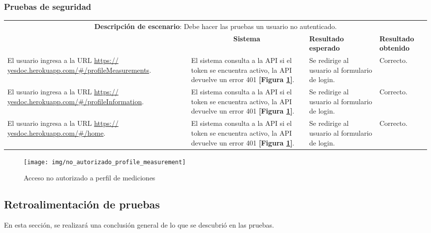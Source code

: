 \subsubsection{Pruebas de seguridad }
\begin{center}
	\begin{longtable}{|m{4cm}|m{4cm}|m{3cm}|m{2cm}|}
		\hline \hline \rowcolor[gray]{0.9}
		\multicolumn{4}{|c|}{\textbf{Procedimiento de pruebas}} \\
		\hline 
		
		\multicolumn{4}{|c|}{\textbf{Descripción de escenario}: Debe hacer las pruebas un usuario no autenticado.} \\
		\hline 
		
		\rowcolor[gray]{0.9}
		\multicolumn{1}{|c|}{\textbf{Actor}} &
		\multicolumn{1}{c|}{\textbf{Sistema}} &
		\textbf{Resultado esperado}&
		\textbf{Resultado obtenido} \\
		\hline
		El usuario ingresa a la URL \url{https:// yesdoc.herokuapp.com/#/profileMeasurements}.
		&
		El sistema consulta a la API si el token se encuentra activo, la API devuelve un error 401 \textbf{[Figura \ref{no_autorizado_profile_measurement}]}.
		&
		Se redirige al usuario al formulario de login.
		&
		Correcto.
		\\ 
		\hline
		El usuario ingresa a la URL \url{https:// yesdoc.herokuapp.com/#/profileInformation}.
		&
		El sistema consulta a la API si el token se encuentra activo, la API devuelve un error 401 \textbf{[Figura \ref{no_autorizado_profile_measurement}]}.
		&
		Se redirige al usuario al formulario de login.
		&
		Correcto.
		\\ 
		\hline
		El usuario ingresa a la URL \url{https:// yesdoc.herokuapp.com/#/home}.
		&
		El sistema consulta a la API si el token se encuentra activo, la API devuelve un error 401 \textbf{[Figura \ref{no_autorizado_profile_measurement}]}.
		&
		Se redirige al usuario al formulario de login.
		&
		Correcto.
		\\ 
		\hline
				
	\end{longtable}
\end{center}

 \begin{figure}[h]
 	\centering
 	\texttt{[image: img/no\_autorizado\_profile\_measurement]}
 	\caption{Acceso no autorizado a perfil de mediciones}
 	\label{no_autorizado_profile_measurement}
 \end{figure}
 
\subsection{Retroalimentación de pruebas}
En esta sección, se realizará una conclusión general de lo que se descubrió en las pruebas.

